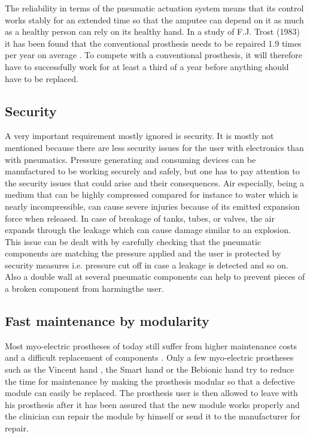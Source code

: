 \documentclass[main]{subfiles}
\begin{document}
The reliability in terms of the pneumatic actuation system means that its control works stably for an extended time so that the amputee can depend on it as much as a healthy person can rely on its healthy hand. In a study of F.J. Trost (1983) it has been found that the conventional prosthesis needs to be repaired 1.9 times per year on average \cite{Trost1983}. To compete with a conventional prosthesis, it will therefore have to successfully work for at least a third of a year before anything should have to be replaced. 
\subsection{Security}
A very important requirement mostly ignored is security. It is mostly not mentioned because there are less security issues for the user with electronics than with pneumatics. Pressure generating and consuming devices can be manufactured to be working securely and safely, but one has to pay attention to the security issues that could arise and their consequences. Air especially, being a medium that can be highly compressed compared for instance to water which is nearly incompressible, can cause severe injuries because of its emitted expansion force when released. In case of breakage of tanks, tubes, or valves, the air expands through the leakage which can cause damage similar to an explosion. This issue can be dealt with by carefully checking that the pneumatic components are matching the pressure applied and the user is protected by security measures i.e. pressure cut off in case a leakage is detected and so on. Also a double wall at several pneumatic components can help to prevent pieces of a broken component from harmingthe user.

\subsection{Fast maintenance by modularity}
Most myo-electric prostheses of today still suffer from higher maintenance costs and a difficult replacement of components \cite{Scotland1983,Trost1983,Datta1989,Ballance1989,Glynn1986,Weaver1988}. Only a few myo-electric prostheses such as the Vincent hand \cite{Schulz2011}, the Smart hand \cite{TheSmartHand2011} or the Bebionic hand \cite{Medynski2011} try to reduce the time for maintenance by making the prosthesis modular so that a defective module can easily be replaced. The prosthesis user is then allowed to leave with his prosthesis after it has been assured that the new module works properly and the clinician can repair the module by himself or send it to the manufacturer for repair.
\end{document}
